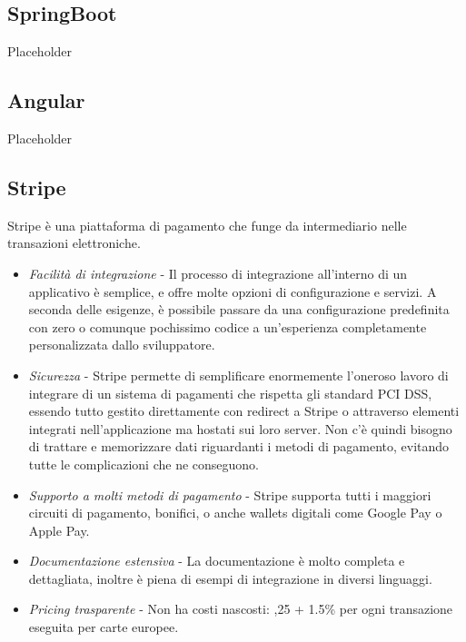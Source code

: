 \subsection {SpringBoot}
Placeholder
\subsection{Angular}
Placeholder
\subsection{Stripe}
Stripe \`e una piattaforma di pagamento che funge da intermediario nelle transazioni elettroniche.
\begin{itemize}
  \item \textit{Facilit\`a di integrazione} - Il processo di integrazione all'interno di un applicativo \`e semplice, e offre molte opzioni di configurazione e servizi.
    A seconda delle esigenze, \`e possibile passare da una configurazione predefinita con zero o comunque pochissimo codice a un'esperienza completamente personalizzata dallo sviluppatore.
  \item \textit{Sicurezza} - Stripe permette di semplificare enormemente l'oneroso lavoro di integrare di un sistema di pagamenti che rispetta
    gli standard PCI DSS, essendo tutto gestito direttamente con redirect a Stripe o attraverso elementi integrati nell'applicazione ma hostati sui loro server. Non c'\`e quindi
    bisogno di trattare e memorizzare dati riguardanti i metodi di pagamento, evitando tutte le complicazioni che ne conseguono.
  \item \textit{Supporto a molti metodi di pagamento} - Stripe supporta tutti i maggiori circuiti di pagamento, bonifici, o anche wallets digitali come Google Pay o Apple Pay.
  \item \textit{Documentazione estensiva} - La documentazione \`e molto completa e dettagliata, inoltre \`e piena di esempi di integrazione in diversi linguaggi.
  \item \textit{Pricing trasparente} - Non ha costi nascosti: ,25 + 1.5\% per ogni transazione eseguita per carte europee.
\end{itemize}
